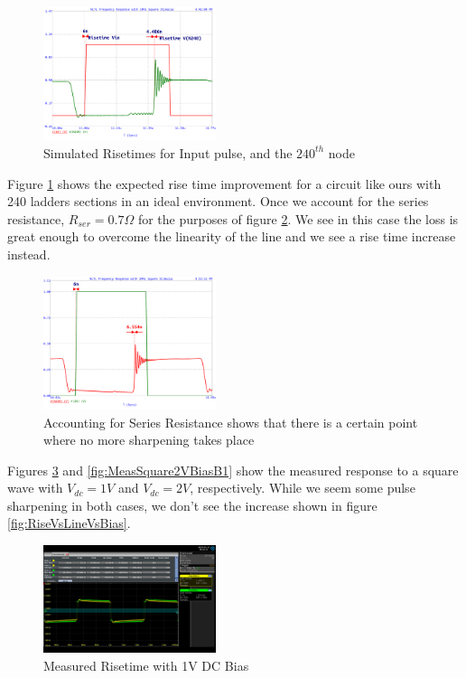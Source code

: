 \documentclass[journal]{IEEEtran} \usepackage[english]{babel}
\begin{document}
\begin{figure}[htb]
\centering
\includegraphics[width=0.45\textwidth]{Probed_Input_N10_N240_NoSeriesResistance}
\caption{Simulated Risetimes for Input pulse, and the $240^{th}$ node}
\label{fig:probedNoResistance}
\end{figure}

Figure \ref{fig:probedNoResistance} shows the expected rise time improvement for
a circuit like ours with 240 ladders sections in an ideal environment. Once we
account for the series resistance, $R_{ser} = 0.7\Omega$ for the purposes of
figure \ref{fig:probedWithResistance}. We see in this case the loss is great
enough to overcome the linearity of the line and we see a rise time increase
instead. 

\begin{figure}[htb]
\centering
\includegraphics[width=0.45\textwidth]{Probed_Input_N10_N240_With_SeriesResistance}
\caption{Accounting for Series Resistance shows that there is a certain point where no more sharpening takes place}
\label{fig:probedWithResistance}
\end{figure}

Figures \ref{fig:MeasuredSquare1VBiasB1} and \ref{fig:MeasSquare2VBiasB1} show
the measured response to a square wave with $V_{dc} = 1V$ and $V_{dc} = 2V$,
respectively. While we seem some pulse sharpening in both cases, we don't see
the increase shown in figure \ref{fig:RiseVsLineVsBias}.


\begin{figure}[htb]
\centering
\includegraphics[width=0.45\textwidth]{MeasuredSquare1VBiasB1.png}
\caption{Measured Risetime with 1V DC Bias}
\label{fig:MeasuredSquare1VBiasB1}
\end{figure}
\end{document}
